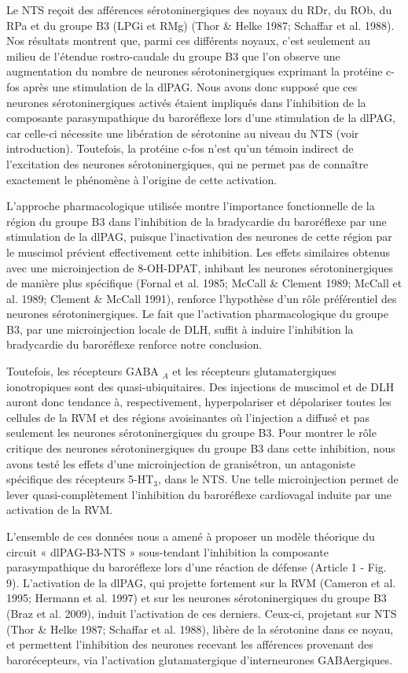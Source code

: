 \documentclass[a4paper,12pt,twoside]{report}
\begin{document}
Le NTS reçoit des afférences sérotoninergiques des noyaux du RDr, du ROb, du RPa et du groupe B3 (LPGi et RMg) (Thor \& Helke 1987; Schaffar et al. 1988). Nos résultats montrent que, parmi ces différents noyaux, c’est seulement au milieu de l’étendue rostro-caudale du groupe B3 que l’on observe une augmentation du nombre de neurones sérotoninergiques exprimant la protéine c-fos après une stimulation de la dlPAG. Nous avons donc supposé que ces neurones sérotoninergiques activés étaient impliqués dans l’inhibition de la composante parasympathique du baroréflexe lors d’une stimulation de la dlPAG, car celle-ci nécessite une libération de sérotonine au niveau du NTS (voir introduction). Toutefois, la protéine c-fos n’est qu’un témoin indirect de l’excitation des neurones sérotoninergiques, qui ne permet pas de connaître exactement le phénomène à l’origine de cette activation.

L’approche pharmacologique utilisée montre l’importance fonctionnelle de la région du groupe B3 dans l’inhibition de la bradycardie du baroréflexe par une stimulation de la dlPAG, puisque l’inactivation des neurones de cette région par le muscimol prévient effectivement cette inhibition. Les effets similaires obtenus avec une microinjection de 8-OH-DPAT, inhibant les neurones sérotoninergiques de manière plus spécifique (Fornal et al. 1985; McCall \& Clement 1989; McCall et al. 1989; Clement \& McCall 1991), renforce l’hypothèse d’un rôle préférentiel des neurones sérotoninergiques. Le fait que l’activation pharmacologique du groupe B3, par une microinjection locale de DLH, suffit à induire l’inhibition la bradycardie du baroréflexe renforce notre conclusion.

Toutefois, les récepteurs GABA $_{A}$ et les récepteurs glutamatergiques ionotropiques sont des quasi-ubiquitaires. Des injections de muscimol et de DLH auront donc tendance à, respectivement, hyperpolariser et dépolariser toutes les cellules de la RVM et des régions avoisinantes où l’injection a diffusé et pas seulement les neurones sérotoninergiques du groupe B3. Pour montrer le rôle critique des neurones sérotoninergiques du groupe B3 dans cette inhibition, nous avons testé les effets d’une microinjection de granisétron, un antagoniste spécifique des récepteurs 5-HT$_{3}$, dans le NTS. Une telle microinjection permet de lever quasi-complètement l’inhibition du baroréflexe cardiovagal induite par une activation de la RVM. 

L’ensemble de ces données nous a amené à proposer un modèle théorique du circuit « dlPAG-B3-NTS » sous-tendant l’inhibition la composante parasympathique du baroréflexe lors d’une réaction de défense (Article 1 - Fig. 9). L’activation de la dlPAG, qui projette fortement sur la RVM (Cameron et al. 1995; Hermann et al. 1997) et sur les neurones sérotoninergiques du groupe B3 (Braz et al. 2009), induit l’activation de ces derniers. Ceux-ci, projetant sur NTS (Thor \& Helke 1987; Schaffar et al. 1988), libère de la sérotonine dans ce noyau, et permettent l’inhibition des neurones recevant les afférences provenant des barorécepteurs, via l’activation glutamatergique d’interneurones GABAergiques.
\end{document}
